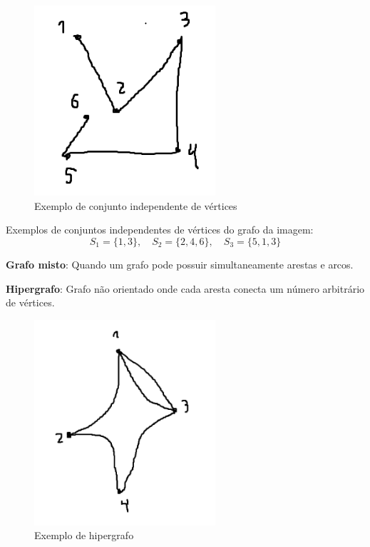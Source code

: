 \begin{figure}[H]
    \centering
    \includegraphics[width=0.6\textwidth]{figuras/Conjuntoidepen.png}
    \caption{Exemplo de conjunto independente de vértices}
\end{figure}

Exemplos de conjuntos independentes de vértices do grafo da imagem:
\[
S_1 = \{1,3\}, \quad
S_2 = \{2,4,6\}, \quad
S_3 = \{5,1,3\}
\]

\medskip

\textbf{Grafo misto}:  
Quando um grafo pode possuir simultaneamente arestas e arcos.

\medskip

\textbf{Hipergrafo}:  
Grafo não orientado onde cada aresta conecta um número arbitrário de vértices.

\begin{figure}[H]
    \centering
    \includegraphics[width=0.6\textwidth]{figuras/Hipergrafo.png}
    \caption{Exemplo de hipergrafo}
\end{figure}

